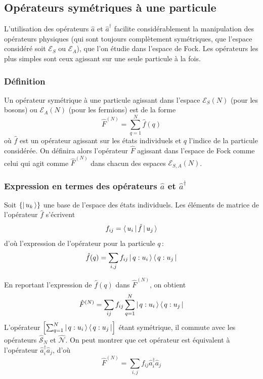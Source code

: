     \subsection{Opérateurs symétriques à une particule}

    L’utilisation des opérateurs $\hat{a}$ et $\hat{a}^{\dagger}$ facilite considérablement la manipulation des opérateurs physiques (qui sont toujours complètement symétriques, que l’espace considéré soit $\mathcal{E}_S$ ou $\mathcal{E}_A$), que l’on étudie dans l’espace de Fock. Les opérateurs les plus simples sont ceux agissant sur une seule particule à la fois.

            \subsubsection{Définition}

            Un opérateur symétrique à une particule agissant dans l’espace $\mathcal{E}_{S}(N)$ (pour les bosons) ou $\mathcal{E}_{A}(N)$ (pour les fermions) est de la forme 
            \[ \hat{F}^{(N)} = \sum_{q = 1}^N \hat{f}(q) \]   
            où $\hat{f}$ est un opérateur agissant sur les états individuels et $q$ l’indice de la particule considérée. On définira alors l’opérateur $\hat{F}$ agissant dans l’espace de Fock comme celui qui agit comme $\hat{F}^{(N)}$ dans chacun des espaces $\mathcal{E}_{S,A}(N)$.

            \subsubsection{Expression en termes des opérateurs $\hat{a}$ et $\hat{a}^{\dagger}$}

            Soit $\left\{\left| \, u_k \, \right>\right\}$ une base de l’espace des états individuels. Les éléments de matrice de l’opérateur $\hat{f}$ s’écrivent
            \[ f_{ij} = \left< \, u_i \, \right| \hat{f} \left| \, u_j \, \right> \]   
            d’où l’expression de l’opérateur pour la particule $q$ : 
            \[ \hat{f}(q) = \sum_{i,j} f_{ij} \left| \, q : u_i \, \right> \left< \, q : u_j \, \right| \]   

            En reportant l’expression de $\hat{f}(q)$ dans $\hat{F}^{(N)}$, on obtient 
            \[ \hat{F}^{(N)} = \sum_{ij} f_{ij} \sum_{q = 1}^N \left| \, q : u_i \, \right> \left< \, q : u_j \, \right| \]
            L’opérateur $\left[\sum_{q = 1}^N  \left| \, q : u_i \, \right> \left< \, q : u_j \, \right|\right]$ étant symétrique, il commute avec les opérateurs $\hat{\mathcal{S}}_N$ et $\hat{\mathcal{N}}$. On peut montrer que cet opérateur est équivalent à l’opérateur $\hat{a}_i^{\dagger} \hat{a}_j$, d’où 
            \[ \hat{F}^{(N)} = \sum_{i,j} f_{ij} \hat{a}_i^{\dagger} \hat{a}_j \]

